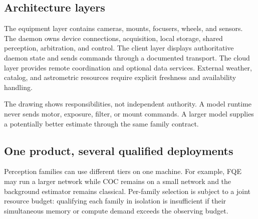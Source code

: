 \documentclass[11pt,a4paper]{article}
\begin{document}
\subsection{Architecture layers}
The equipment layer contains cameras, mounts, focusers, wheels, and sensors.
The daemon owns device connections, acquisition, local storage, shared
perception, arbitration, and control. The client layer displays authoritative
daemon state and sends commands through a documented transport. The cloud
layer provides remote coordination and optional data services. External weather,
catalog, and astrometric resources require explicit freshness and availability
handling.

\begin{center}
\end{center}
The drawing shows responsibilities, not independent authority. A model runtime
never sends motor, exposure, filter, or mount commands. A larger model supplies
a potentially better estimate through the same family contract.

\subsection{One product, several qualified deployments}
Perception families can use different tiers on one machine. For example, FQE
may run a larger network while COC remains on a small network and the background
estimator remains classical. Per-family selection is subject to a joint resource
budget: qualifying each family in isolation is insufficient if their simultaneous
memory or compute demand exceeds the observing budget.
\end{document}
